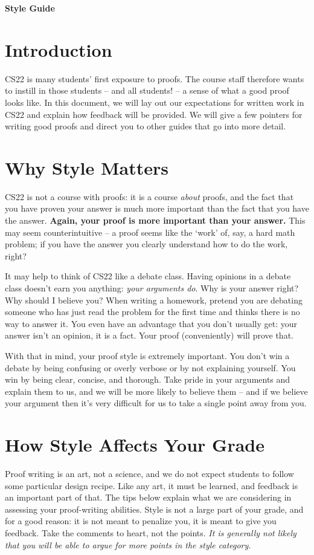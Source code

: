 \documentclass[12pt,letterpaper]{article}
\begin{document}
\begin{center} 
  {\Huge\bf Style Guide}
\end{center}

\section*{Introduction}
CS22 is many students' first exposure to proofs. The course staff therefore wants to instill in those students -- and all students! -- a sense of what a good proof looks like. In this document, we will lay out our expectations for written work in CS22 and explain how feedback will be provided. We will give a few pointers for writing good proofs and direct you to other guides that go into more detail.

\section*{Why Style Matters}
CS22 is not a course with proofs: it is a course \textit{about} proofs, and the fact that you have proven your answer is much more important than the fact that you have the answer. \textbf{Again, your proof is more important than your answer.} This may seem counterintuitive -- a proof seems like the `work' of, say, a hard math problem; if you have the answer you clearly understand how to do the work, right?

It may help to think of CS22 like a debate class. Having opinions in a debate class doesn't earn you anything: \textit{your arguments do}. Why is your answer right? Why should I believe you? When writing a homework, pretend you are debating someone who has just read the problem for the first time and thinks there is no way to answer it. You even have an advantage that you don't usually get: your answer isn't an opinion, it is a fact. Your proof (conveniently) will prove that.

With that in mind, your proof style is extremely important. You don't win a debate by being confusing or overly verbose or by not explaining yourself. You win by being clear, concise, and thorough. Take pride in your arguments and explain them to us, and we will be more likely to believe them -- and if we believe your argument then it's very difficult for us to take a single point away from you.

\section*{How Style Affects Your Grade}
Proof writing is an art, not a science, and we do not expect students to follow some particular design recipe. Like any art, it must be learned, and feedback is an important part of that. The tips below explain what we are considering in assessing your proof-writing abilities.
Style is not a large part of your grade, and for a good reason: it is not meant to penalize you, it is meant to give you feedback. Take the comments to heart, not the points. \textit{It is generally not likely that you will be able to argue for more points in the style category.}
\end{document}
